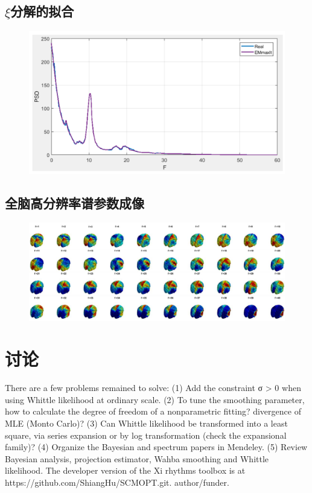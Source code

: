 \subsection{$\xi$分解的拟合}
\begin{figure}[!ht]
	\includegraphics[width=15cm]{pic/xipi/figure3_1.png}
	\caption{}
	\label{fig3_1}
\end{figure}
\subsection{全脑高分辨率谱参数成像}
\begin{figure}[!ht]
	\includegraphics[width=15cm]{pic/xipi/figure4.png}
	\caption{}
	\label{fig4}
\end{figure}

\section{讨论}
There are a few problems remained to solve: (1) Add the constraint σ > 0 when using Whittle likelihood at
ordinary scale. (2) To tune the smoothing parameter, how to calculate the degree of freedom of a
nonparametric fitting? divergence of MLE (Monto Carlo)? (3) Can Whittle likelihood be transformed into a least
square, via series expansion or by log transformation (check the expansional family)? (4) Organize the Bayesian
and spectrum papers in Mendeley. (5) Review Bayesian analysis, projection estimator, Wahba smoothing and
Whittle likelihood.
The developer version of the Xi rhythms toolbox is at https://github.com/ShiangHu/SCMOPT.git.
author/funder. 

